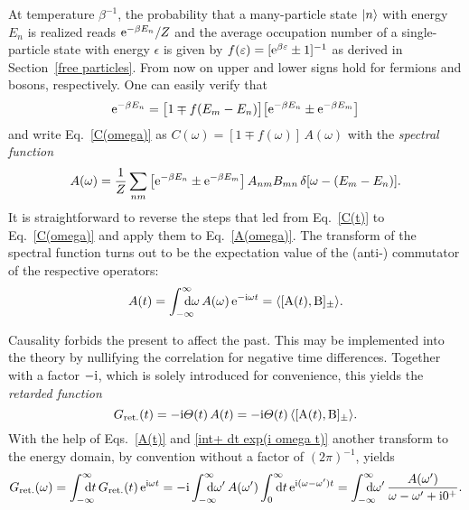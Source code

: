 At temperature $\beta^{-1}$, the probability that a many-particle state $|n\rangle$
with energy $E_n$ is realized reads $\mathrm e^{-\beta E_n} / Z$ and the average
occupation number of a single-particle state with energy $\epsilon$ is given by
$f(\varepsilon) = [\mathrm e^{\beta \varepsilon} \pm 1]^{-1}$ as derived in Section~\ref{free
particles}. From now on upper and lower signs hold for fermions and bosons,
respectively. One can easily verify that
%
\begin{equation*}
    \mathrm e^{-\beta E_n} =
    \big[ 1 \mp f(E_m - E_n) \big]
    \big[ \mathrm e^{-\beta E_n} \pm \mathrm e^{-\beta E_m} \big]
\end{equation*}
%
and write Eq.~\ref{C(omega)} as $C(\omega) = [1 \mp f(\omega)] \, A(\omega)$ with the \emph{spectral function}
%
\begin{equation} \label{A(omega)}
    A(\omega) = \frac 1 Z \sum_{n m} \big[
        \mathrm e^{-\beta E_n} \pm \mathrm e^{-\beta E_m}
    \big] \, A_{n m} B_{m n} \, \delta[\omega - (E_m - E_n)].
\end{equation}
%
It is straightforward to reverse the steps that led from Eq.~\ref{C(t)} to
Eq.~\ref{C(omega)} and apply them to Eq.~\ref{A(omega)}. The 
transform of the spectral function turns out to be the expectation value of the
(anti-) commutator of the respective operators:
%
\begin{equation} \label{A(t)}
    A(t) = \int \from{-\infty} \till \infty \D \omega \,
    A(\omega) \, \E^{-\I \omega t} =
    \av{[\op A(t), \op B]_\pm}.
\end{equation}

Causality forbids the present to affect the past. This may be implemented into
the theory by nullifying the correlation for negative time differences. Together
with a factor $-\mathrm i$, which is solely introduced for convenience, this yields the
\emph{retarded  function}
%
\begin{equation} \label{G_ret(t)}
    G \sb{\text{ret.}} (t) = -\mathrm i \varTheta(t) \, A(t) =
    -\mathrm i \varTheta(t) \, \langle[\mathrm A(t), \mathrm B]_\pm\rangle.
\end{equation}
%
With the help of Eqs.~\ref{A(t)} and \ref{int+ dt exp(i omega t)} another
 transform to the energy domain, by convention without a factor of
$(2 \pi)^{-1}$, yields
%
\begin{equation} \label{G_ret(omega)}
    G \sub{ret.} (\omega) = \int \from{-\infty} \till \infty \D t \,
    G \sub{ret.} (t) \, \E^{\I \omega t} = -\I
    \int \from{-\infty} \till \infty \D \omega' \, A(\omega')
    \int \from 0 \till \infty \D t \, \E^{\I (\omega - \omega') t} =
    \int \from{-\infty} \till \infty \D \omega' \,
    \frac{A(\omega')}{\omega - \omega' + \I 0^+}.
\end{equation}

